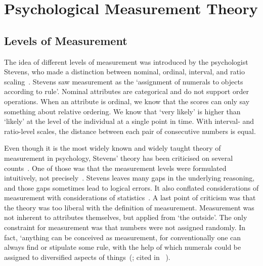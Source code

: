 \documentclass[titlepage, a4paper, 11pt]{article}
\begin{document}
\section{Psychological Measurement Theory}
\subsection{Levels of Measurement}
The idea of different levels of measurement was introduced by the psychologist Stevens, who made a distinction between nominal, ordinal, interval, and ratio scaling~\citep{stevens_theory_1946}. Stevens saw measurement as the `assignment of numerals to objects according to rule'. Nominal attributes are categorical and do not support order operations. When an attribute is ordinal, we know that the scores can only say something about relative ordering. We know that `very likely' is higher than `likely' at the level of the individual at a single point in time. With interval- and ratio-level scales, the distance between each pair of consecutive numbers is equal. 

Even though it is the most widely known and widely taught theory of measurement in psychology, Stevens' theory has been criticised on several counts~\citep{michell_measurement_1999}. One of those was that the measurement levels were formulated intuitively, not precisely~\citep{narens_measurement_1986}. Stevens leaves many gaps in the underlying reasoning, and those gaps sometimes lead to logical errors. It also conflated considerations of measurement with considerations of statistics~\citep{gaito_measurement_1980}. A last point of criticism was that the theory was too liberal with the definition of measurement. Measurement was not inherent to attributes themselves, but applied from `the outside'. The only constraint for measurement was that numbers were not assigned randomly. In fact, ‘anything can be conceived as measurement, for conventionally one can always find or stipulate some rule, with the help of which numerals could be assigned to diversified aspects of things~(\citealp{berka_measurement_1983}; cited in ~\citealp{trendler_measurement_2009}). 
\end{document}
